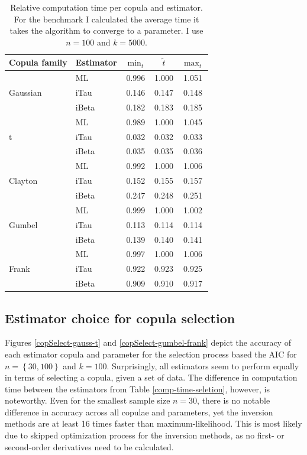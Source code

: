 \begin{table}[h!]
	\centering
{\renewcommand{\arraystretch}{1.3}
	\begin{tabular}{ll|ccc}
		Copula family             & Estimator & $\min_t$   & $\tilde{t}$ & $\max_t$   \\ \hline \hline
		\multirow{3}{*}{Gaussian} & ML        & 0.996 & 1.000      & 1.051 \\
		& iTau      & 0.146 & 0.147  & 0.148 \\
		& iBeta     & 0.182 & 0.183  & 0.185 \\ \hline
		\multirow{3}{*}{t}        & ML        & 0.989 & 1.000      & 1.045 \\
		& iTau      & 0.032 & 0.032  & 0.033 \\
		& iBeta     & 0.035 & 0.035  & 0.036 \\ \hline
		\multirow{3}{*}{Clayton}  & ML        & 0.992 & 1.000      & 1.006 \\
		& iTau      & 0.152 & 0.155  & 0.157 \\
		& iBeta     & 0.247 & 0.248  & 0.251 \\ \hline
		\multirow{3}{*}{Gumbel}   & ML        & 0.999 & 1.000      & 1.002 \\
		& iTau      & 0.113 & 0.114  & 0.114 \\
		& iBeta     & 0.139 & 0.140  & 0.141 \\ \hline
		\multirow{3}{*}{Frank}    & ML        & 0.997 & 1.000      & 1.006 \\
		& iTau      & 0.922 & 0.923  & 0.925 \\
		& iBeta     & 0.909 & 0.910  & 0.917
	\end{tabular}
}
\caption[Relative computation time per estimator and copula for parameter estimation.]{Relative computation time per copula and estimator. For the benchmark I calculated the average time it takes the algorithm to converge to a parameter. I use $n = 100$ and $k = 5000$.}
\label{rel-comp-time-est}
\end{table}

\subsection{Estimator choice for copula selection}

Figures \ref{copSelect-gauss-t} and \ref{copSelect-gumbel-frank} depict the accuracy of each estimator copula and parameter for the selection process based the AIC for $ n = \left\lbrace 30,100 \right\rbrace $ and $k = 100$. Surprisingly, all estimators seem to perform equally in terms of selecting a copula, given a set of data. The difference in computation time between the estimators from Table \ref{comp-time-seletion}, however, is noteworthy. Even for the smallest sample size $n = 30$, there is no notable difference in accuracy across all copulae and parameters, yet the inversion methods are at least 16 times faster than maximum-likelihood. This is most likely due to skipped optimization process for the inversion methods, as no first- or second-order derivatives need to be calculated.



